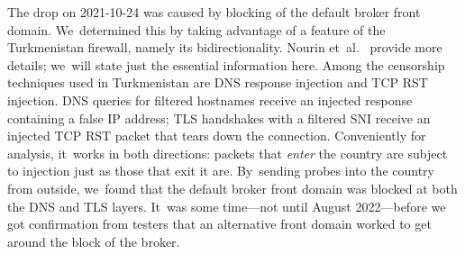 \documentclass[letterpaper,twocolumn]{article}
\begin{document}
The drop on \mbox{2021-10-24} was caused by
blocking of the default broker front domain.
We~determined this by
taking advantage of a feature of the Turkmenistan firewall,
namely its bidirectionality.
Nourin et~al.~\cite[\S 2]{Nourin2023a} provide more details;
we~will state just the essential information here.
Among the censorship techniques used in Turkmenistan
are DNS response injection and TCP RST injection.
DNS queries for filtered hostnames receive an injected response
containing a false IP address;
TLS handshakes with a filtered SNI receive an injected TCP RST packet
that tears down the connection.
Conveniently for analysis,
it~works in both directions:
packets that \emph{enter} the country are subject to injection
just as those that exit it are.
By~sending probes into the country from outside,
we~found that the default broker front domain
was blocked at both the DNS and TLS layers.
It~was some time---not until August 2022---before we got
confirmation from testers that an alternative front domain
worked to get around the block of the broker.

\end{document}
